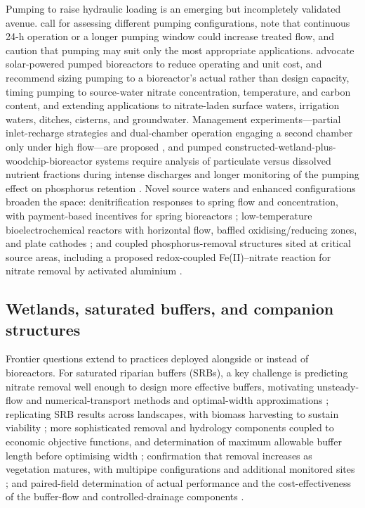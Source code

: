 Pumping to raise hydraulic loading is an emerging but incompletely validated
avenue. \textcite{DíazGarcía2025} call for assessing different pumping
configurations, note that continuous 24-h operation or a longer pumping window
could increase treated flow, and caution that pumping may suit only the most
appropriate applications. \textcite{Hartfiel2024} advocate solar-powered pumped
bioreactors to reduce operating and unit cost, and \textcite{Hartfiel2023}
recommend sizing pumping to a bioreactor's actual rather than design capacity,
timing pumping to source-water nitrate concentration, temperature, and carbon
content, and extending applications to nitrate-laden surface waters, irrigation
waters, ditches, cisterns, and groundwater. Management experiments---partial
inlet-recharge strategies and dual-chamber operation engaging a second chamber
only under high flow---are proposed \parencite{Hartfiel2023b}, and pumped
constructed-wetland-plus-woodchip-bioreactor systems require analysis of
particulate versus dissolved nutrient fractions during intense discharges and
longer monitoring of the pumping effect on phosphorus retention
\parencite{Pugliese2020}. Novel source waters and enhanced configurations broaden
the space: denitrification responses to spring flow and concentration, with
payment-based incentives for spring bioreactors \parencite{Easton2019};
low-temperature bioelectrochemical reactors with horizontal flow, baffled
oxidising/reducing zones, and plate cathodes \parencite{Law2018}; and coupled
phosphorus-removal structures sited at critical source areas, including a proposed
redox-coupled Fe(II)--nitrate reaction for nitrate removal by activated aluminium
\parencite{Penn2024}.

\subsection{Wetlands, saturated buffers, and companion structures}

Frontier questions extend to practices deployed alongside or instead of
bioreactors. For saturated riparian buffers (SRBs), a key challenge is predicting
nitrate removal well enough to design more effective buffers, motivating
unsteady-flow and numerical-transport methods and optimal-width approximations
\parencite{McEachran2020}; replicating SRB results across landscapes, with
biomass harvesting to sustain viability \parencite{Jaynes2014}; more
sophisticated removal and hydrology components coupled to economic objective
functions, and determination of maximum allowable buffer length before optimising
width \parencite{Abdalaal2023}; confirmation that removal increases as vegetation
matures, with multipipe configurations and additional monitored sites
\parencite{Jaynes2019,Jaynes2019b,Singh2024b}; and paired-field determination of
actual performance and the cost-effectiveness of the buffer-flow and
controlled-drainage components \parencite{Ghane2025}.

